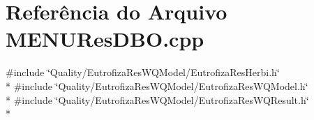 \section{Referência do Arquivo M\+E\+N\+U\+Res\+D\+B\+O.\+cpp}
\label{_m_e_n_u_res_d_b_o_8cpp}
{\ttfamily \#include \char`\"{}Quality/\+Eutrofiza\+Res\+W\+Q\+Model/\+Eutrofiza\+Res\+Herbi.\+h\char`\"{}}\\*
{\ttfamily \#include \char`\"{}Quality/\+Eutrofiza\+Res\+W\+Q\+Model/\+Eutrofiza\+Res\+W\+Q\+Model.\+h\char`\"{}}\\*
{\ttfamily \#include \char`\"{}Quality/\+Eutrofiza\+Res\+W\+Q\+Model/\+Eutrofiza\+Res\+W\+Q\+Result.\+h\char`\"{}}\\*
